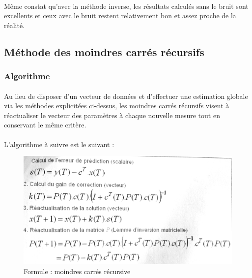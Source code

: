 \documentclass[a4paper,11pt]{article}
\begin{document}
			\paragraph{}
			Même constat qu’avec la méthode inverse, les résultats calculés sans le bruit sont excellents et ceux avec le bruit restent relativement bon et assez proche de la réalité.

	\newpage

		\subsection{Méthode des moindres carrés récursifs}

			\subsubsection{Algorithme}

			\paragraph{}
			Au lieu de disposer d’un vecteur de données et d’effectuer une estimation globale via les méthodes explicitées ci-dessus, les moindres carrés récursifs visent à réactualiser le vecteur des paramètres à chaque nouvelle mesure tout en conservant le même critère.

			\paragraph{}
			L’algorithme à suivre est le suivant :

			\begin{figure}[h]
				\centerline{\includegraphics[scale=0.50]{img/moindres_carres_rec.png}}
				\caption{Formule : moindres carrés récursive}
				\label{diagramme-composants}
			\end{figure}
\end{document}
